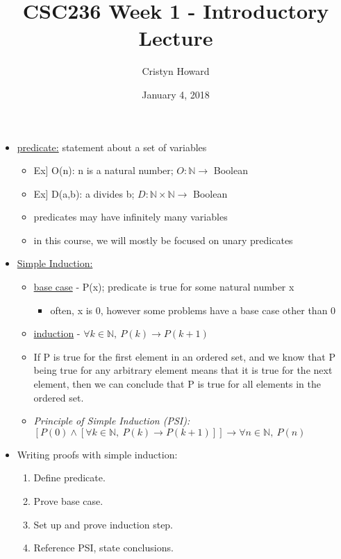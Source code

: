 \documentclass[11pt, oneside]{article}
\title{CSC236 Week 1 - Introductory Lecture}
\author{Cristyn Howard}
\date{January 4, 2018}
\begin{document}
\maketitle

\begin{itemize}
\item \underline{predicate:} statement about a set of variables
	\begin{itemize}
	\item Ex] O(n): n is a natural number; \hspace{15pt} $O:\mathbb{N}\rightarrow$ Boolean
	\item Ex] D(a,b): a divides b; \hspace{15pt} $D:\mathbb{N}\times\mathbb{N}\rightarrow$ Boolean
	\item predicates may have infinitely many variables
	\item in this course, we will mostly be focused on unary predicates
	\end{itemize}
	
\item \underline{Simple Induction:}
	\begin{itemize} 
	\item \underline{base case} - P(x); predicate is true for some natural number x
		\begin{itemize}
		\item often, x is 0, however some problems have a base case other than 0
		\end{itemize}
	\item \underline{induction} - $\forall k \in \mathbb{N},\:P(k)\rightarrow P(k+1)$
	\item If P is true for the first element in an ordered set, and we know that P being true for any arbitrary element means that it is true for the next element, then we can conclude that P is true for all elements in the ordered set.
	\item \emph{Principle of Simple Induction (PSI):} $[P(0) \land [\forall k \in \mathbb{N},\:P(k)\rightarrow P(k+1)] ] \rightarrow \forall n \in \mathbb{N},\: P(n)$
	\end{itemize}

\item Writing proofs with simple induction:
	\begin{enumerate}
	\item Define predicate.
	\item Prove base case.
	\item Set up and prove induction step.
	\item Reference PSI, state conclusions.
	\end{enumerate}
	

\end{itemize}
\end{document}
